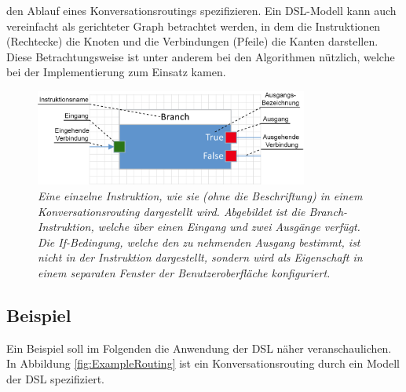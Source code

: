 den Ablauf eines Konversationsroutings spezifizieren. Ein DSL-Modell kann auch vereinfacht als gerichteter Graph betrachtet werden, in dem die Instruktionen (Rechtecke) die Knoten und die Verbindungen (Pfeile) die Kanten darstellen. Diese Betrachtungsweise ist unter anderem bei den Algorithmen nützlich, welche bei der Implementierung zum Einsatz kamen.
\begin{figure} %
	\centering
		\includegraphics[width=0.8\textwidth]{img/SingleNodeWithAnnotations.png}
	\caption[Beschriftung einer DSL-Instruktion]{\textit{Eine einzelne Instruktion, wie sie (ohne die Beschriftung) in einem Konversationsrouting dargestellt wird. Abgebildet ist die Branch-Instruktion, welche über einen Eingang und zwei Ausgänge verfügt. Die If-Bedingung, welche den zu nehmenden Ausgang bestimmt, ist nicht in der Instruktion dargestellt, sondern wird als Eigenschaft in einem separaten Fenster der Benutzeroberfläche konfiguriert.}}
	\label{fig:SingleNode}
\end{figure}

\subsection{Beispiel}
Ein Beispiel soll im Folgenden die Anwendung der DSL näher veranschaulichen. In Abbildung \ref{fig:ExampleRouting} ist ein Konversationsrouting durch ein Modell der DSL spezifiziert. 

